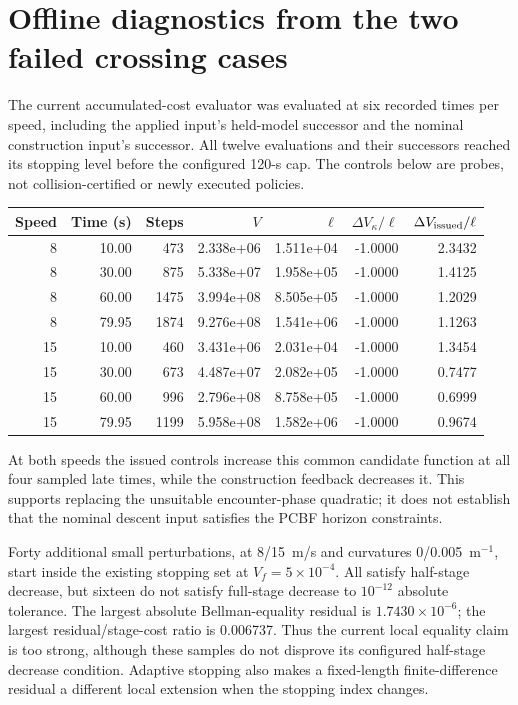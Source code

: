 \documentclass[11pt]{article}
\begin{document}
\section{Offline diagnostics from the two failed crossing cases}
The current accumulated-cost evaluator was evaluated at six recorded times
per speed, including the applied input's held-model successor and the nominal
construction input's successor. All twelve evaluations and their successors
reached its stopping level before the configured 120-s cap. The controls below
are probes, not collision-certified or newly executed policies.
\begin{center}\small
\begin{tabular}{rrrrrrr}\toprule
Speed & Time (s) & Steps & $V$ & $\ell$ & $\Delta V_\kappa/\ell$ & $\Delta V_{\rm issued}/\ell$\\\midrule
8 & 10.00 & 473 & 2.338e+06 & 1.511e+04 & -1.0000 & 2.3432 \\
8 & 30.00 & 875 & 5.338e+07 & 1.958e+05 & -1.0000 & 1.4125 \\
8 & 60.00 & 1475 & 3.994e+08 & 8.505e+05 & -1.0000 & 1.2029 \\
8 & 79.95 & 1874 & 9.276e+08 & 1.541e+06 & -1.0000 & 1.1263 \\
15 & 10.00 & 460 & 3.431e+06 & 2.031e+04 & -1.0000 & 1.3454 \\
15 & 30.00 & 673 & 4.487e+07 & 2.082e+05 & -1.0000 & 0.7477 \\
15 & 60.00 & 996 & 2.796e+08 & 8.758e+05 & -1.0000 & 0.6999 \\
15 & 79.95 & 1199 & 5.958e+08 & 1.582e+06 & -1.0000 & 0.9674 \\
\bottomrule\end{tabular}\end{center}
At both speeds the issued controls increase this common candidate function
at all four sampled late times, while the construction feedback decreases it.
This supports replacing the unsuitable encounter-phase quadratic; it does not
establish that the nominal descent input satisfies the PCBF horizon constraints.

Forty additional small perturbations, at 8/15~m/s and curvatures 0/0.005~m$^{-1}$,
start inside the existing stopping set at $V_f=5\times10^{-4}$. All satisfy
half-stage decrease, but sixteen do not satisfy full-stage decrease to
$10^{-12}$ absolute tolerance. The largest absolute Bellman-equality residual
is $1.7430\times10^{-6}$; the largest residual/stage-cost ratio is 0.006737.
Thus the current local equality claim is too strong, although these samples
do not disprove its configured half-stage decrease condition. Adaptive
stopping also makes a fixed-length finite-difference residual a different
local extension when the stopping index changes.
\end{document}
